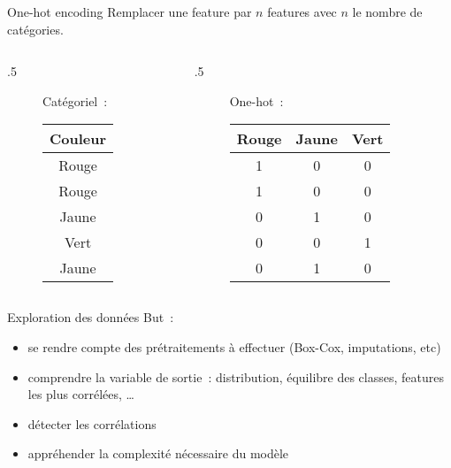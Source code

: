 \begin{frame}{One-hot encoding}
  Remplacer une feature par $n$ features avec $n$ le nombre de
  catégories.
  \begin{columns}
    \begin{column}{.5\tw}
      \begin{figure}
        \centering
        Catégoriel :\\[.5cm]
        \begin{tabular}{c}
          \toprule
          Couleur \\
          \midrule
          Rouge \\
          Rouge \\
          Jaune \\
          Vert \\
          Jaune \\
          \bottomrule
        \end{tabular}
      \end{figure}
    \end{column}
    \begin{column}{.5\tw}
      \begin{figure}
        \centering
        One-hot :\\[.5cm]
        \begin{tabular}{ccc}
          \toprule
          Rouge & Jaune & Vert \\
          \midrule
          1 & 0 & 0 \\
          1 & 0 & 0 \\
          0 & 1 & 0 \\
          0 & 0 & 1 \\
          0 & 1 & 0 \\
          \bottomrule
        \end{tabular}
      \end{figure}
    \end{column}
  \end{columns}
\end{frame}

\begin{frame}{Exploration des données}
  But :
  \begin{itemize}[<+->]
  \item se rendre compte des prétraitements à effectuer (Box-Cox,
    imputations, etc)
  \item comprendre la variable de sortie : distribution, équilibre des
    classes, features les plus corrélées, …
  \item détecter les corrélations
  \item appréhender la complexité nécessaire du modèle
  \end{itemize}
\end{frame}

